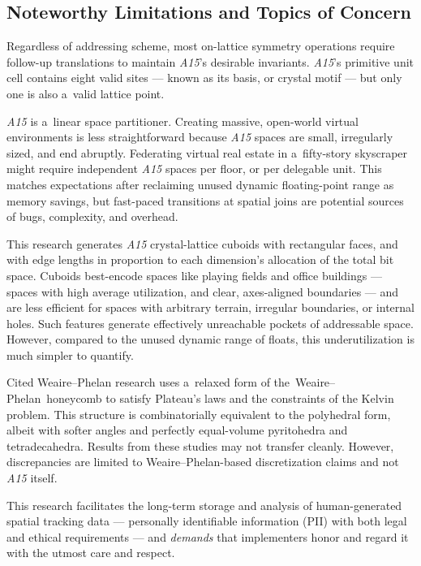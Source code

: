 \documentclass[10pt]{article}
\def\AAAB{\textit{A15}}
\def\WP{Weaire--Phelan} \def\WPH{Weaire--Phelan~Honeycomb} \def\TWPh{The~Weaire--Phelan~honeycomb}
\def\tWPh{the~Weaire--Phelan~honeycomb}
\begin{document}
\subsection{Noteworthy Limitations and Topics of Concern}\label{noteworthy-limitations-and-topics-of-concern}

Regardless of addressing scheme, most on-lattice symmetry operations require follow-up translations to maintain \AAAB's desirable
invariants. \AAAB{}'s primitive unit cell contains eight valid sites --- known as its basis, or crystal motif --- but only one is
also a~valid lattice point.

\AAAB{} is a~linear space partitioner. Creating massive, open-world virtual environments is less straightforward because \AAAB{}
spaces are small, irregularly sized, and end abruptly. Federating virtual real estate in a~fifty-story skyscraper might require
independent \AAAB{} spaces per floor, or per delegable unit. This matches expectations after reclaiming unused dynamic
floating-point range as memory savings, but fast-paced transitions at spatial joins are potential sources of bugs, complexity,
and overhead.

This research generates \AAAB{} crystal-lattice cuboids with rectangular faces, and with edge lengths in proportion to each
dimension's allocation of the total bit space. Cuboids best-encode spaces like playing fields and office buildings --- spaces with
high average utilization, and clear, axes-aligned boundaries --- and are less efficient for spaces with arbitrary terrain,
irregular boundaries, or internal holes. Such features generate effectively unreachable pockets of addressable space. However,
compared to the unused dynamic range of floats, this underutilization is much simpler to quantify.

Cited \WP{} research uses a~relaxed form of \tWPh{} to satisfy Plateau's laws and the constraints of the Kelvin problem. This
structure is combinatorially equivalent to the polyhedral form, albeit with softer angles and perfectly equal-volume pyritohedra
and tetradecahedra. Results from these studies may not transfer cleanly. However, discrepancies are limited to \WP-based
discretization claims and not \AAAB{} itself.

This research facilitates the long-term storage and analysis of human-generated spatial tracking data --- personally identifiable
information (PII) with both legal and ethical requirements --- and \emph{demands} that implementers honor and regard it with the
utmost care and respect.
\end{document}
